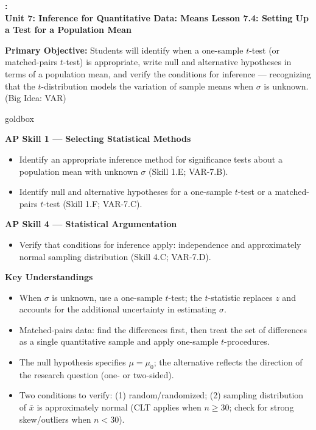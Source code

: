 \documentclass[10pt]{article}
\newcommand{\UnitNumberName}{Unit 7: Inference for Quantitative Data: Means \quad}
\newcommand{\LessonNumberName}{Lesson 7.4: Setting Up a Test for a Population Mean}
\begin{document}
\begin{center}
    {\Large\bfseries \CourseName: \SchoolYear \\
    {\small\bfseries \UnitNumberName \LessonNumberName}}
\end{center}

\begin{tcolorbox}[colback=sky, colframe=navy, boxrule=0.9pt, arc=2mm,
    left=2mm, right=2mm, top=1.5mm, bottom=1.5mm]
    \textbf{Primary Objective:} Students will identify when a one-sample $t$-test (or
    matched-pairs $t$-test) is appropriate, write null and alternative hypotheses in terms
    of a population mean, and verify the conditions for inference --- recognizing that the
    $t$-distribution models the variation of sample means when $\sigma$ is unknown.
    (Big Idea: VAR)
\end{tcolorbox}

\renewcommand{\arraystretch}{1.6}
\begin{skillbox}{goldbox}
\begin{minipage}[t]{0.48\linewidth}
    \textbf{AP Skill 1 --- Selecting Statistical Methods}
    \begin{itemize}
        \item Identify an appropriate inference method for significance tests about a
              population mean with unknown $\sigma$ (Skill 1.E; VAR-7.B).
        \item Identify null and alternative hypotheses for a one-sample $t$-test or a
              matched-pairs $t$-test (Skill 1.F; VAR-7.C).
    \end{itemize}
    \textbf{AP Skill 4 --- Statistical Argumentation}
    \begin{itemize}
        \item Verify that conditions for inference apply: independence and approximately
              normal sampling distribution (Skill 4.C; VAR-7.D).
    \end{itemize}
\end{minipage}
\hfill
\begin{minipage}[t]{0.48\linewidth}
    \textbf{Key Understandings}
    \begin{itemize}
        \item When $\sigma$ is unknown, use a one-sample $t$-test; the $t$-statistic
              replaces $z$ and accounts for the additional uncertainty in estimating $\sigma$.
        \item Matched-pairs data: find the differences first, then treat the set of
              differences as a single quantitative sample and apply one-sample $t$-procedures.
        \item The null hypothesis specifies $\mu = \mu_0$; the alternative reflects the
              direction of the research question (one- or two-sided).
        \item Two conditions to verify: (1) random/randomized; (2) sampling distribution
              of $\bar x$ is approximately normal (CLT applies when $n \ge 30$; check for
              strong skew/outliers when $n < 30$).
    \end{itemize}
\end{minipage}
\end{skillbox}
\end{document}
